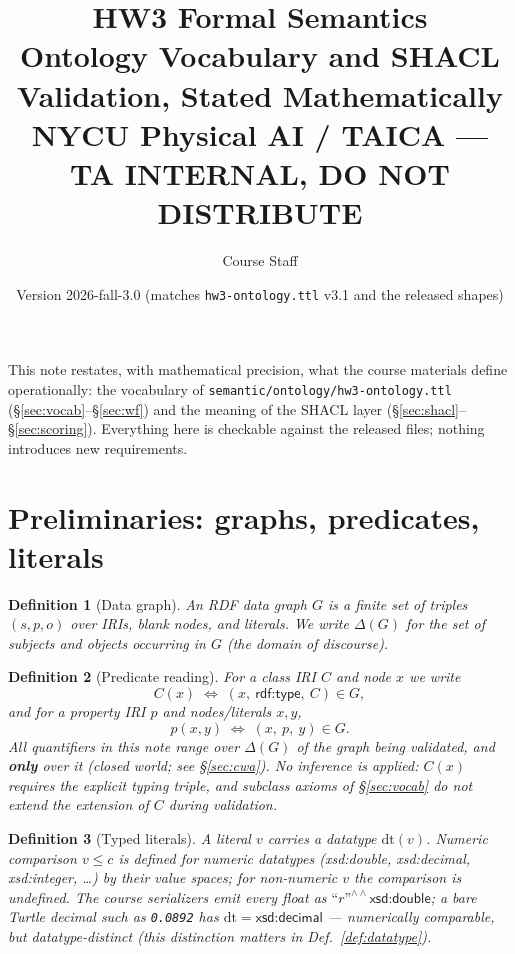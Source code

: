\documentclass[11pt,a4paper]{article}
\title{\textbf{HW3 Formal Semantics}\\[2pt]
\large Ontology Vocabulary and SHACL Validation, Stated Mathematically\\[4pt]
\normalsize NYCU Physical AI / TAICA --- TA INTERNAL, DO NOT DISTRIBUTE}
\author{Course Staff}
\date{Version 2026-fall-3.0 (matches \texttt{hw3-ontology.ttl} v3.1 and the released shapes)}
\newtheorem{definition}{Definition}[section]
\newcommand{\IRI}[1]{\textsf{#1}}                    %
\newcommand{\lit}[1]{\text{``}#1\text{''}}           %
\newcommand{\graph}{G}
\newcommand{\Deltares}{\Delta}
\newcommand{\dtype}{\mathrm{dt}}
\newcommand{\dbl}{\IRI{xsd{:}double}}
\begin{document}
\sloppy
\maketitle

\noindent
This note restates, with mathematical precision, what the course materials define
operationally: the vocabulary of \texttt{semantic/ontology/hw3-ontology.ttl}
(\S\ref{sec:vocab}--\S\ref{sec:wf}) and the meaning of the SHACL layer
(\S\ref{sec:shacl}--\S\ref{sec:scoring}). Everything here is checkable against the
released files; nothing introduces new requirements.

\section{Preliminaries: graphs, predicates, literals}

\begin{definition}[Data graph]
An RDF \emph{data graph} $\graph$ is a finite set of triples $(s,p,o)$ over IRIs,
blank nodes, and literals. We write $\Deltares(\graph)$ for the set of subjects
and objects occurring in $\graph$ (the \emph{domain} of discourse).
\end{definition}

\begin{definition}[Predicate reading]\label{def:pred}
For a class IRI $C$ and node $x$ we write
\[
  C(x) \;\Longleftrightarrow\; (x,\ \IRI{rdf{:}type},\ C) \in \graph ,
\]
and for a property IRI $p$ and nodes/literals $x,y$,
\[
  p(x,y) \;\Longleftrightarrow\; (x,\ p,\ y) \in \graph .
\]
All quantifiers in this note range over $\Deltares(\graph)$ of the graph being
validated, and \textbf{only} over it (closed world; see \S\ref{sec:cwa}).
No inference is applied: $C(x)$ requires the \emph{explicit} typing triple, and
subclass axioms of \S\ref{sec:vocab} do \emph{not} extend the extension of $C$
during validation.
\end{definition}

\begin{definition}[Typed literals]
A literal $v$ carries a datatype $\dtype(v)$. Numeric comparison $v \le c$ is
defined for numeric datatypes (\IRI{xsd{:}double}, \IRI{xsd{:}decimal},
\IRI{xsd{:}integer}, \ldots) by their value spaces; for non-numeric $v$ the
comparison is \emph{undefined}. The course serializers emit every float as
$\lit{r}^{\wedge\wedge}\dbl$; a bare Turtle decimal such as \texttt{0.0892} has
$\dtype = \IRI{xsd{:}decimal}$ --- numerically comparable, but datatype-distinct
(this distinction matters in Def.~\ref{def:datatype}).
\end{definition}
\end{document}

